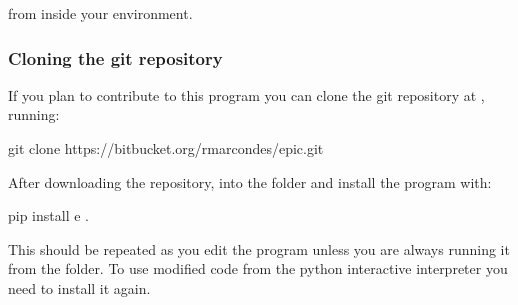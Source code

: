 \documentclass[letterpaper,12pt,english]{sphinxhowto}
\begin{document}
from inside your environment.


\subsubsection{Cloning the git repository}
\label{\detokenize{howtoinstall:cloning-the-git-repository}}
If you plan to contribute to this program you can clone the git repository at
, running:

%
\begin{sphinxVerbatim}[commandchars=\\\{\}]
\PYGZdl{} git clone https://bitbucket.org/rmarcondes/epic.git
\end{sphinxVerbatim}

After downloading the repository,  into the  folder and install
the program with:

%
\begin{sphinxVerbatim}[commandchars=\\\{\}]
\PYGZdl{} pip install \PYGZhy{}e .
\end{sphinxVerbatim}

This should be repeated as you edit the program unless you are always running
it from the  folder.
To use modified code from the python interactive interpreter you need to install
it again.
\end{document}
